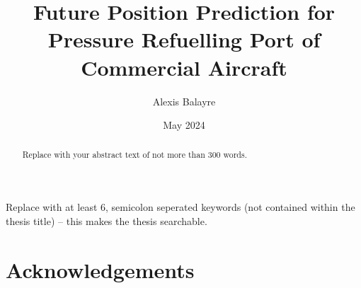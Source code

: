 \documentclass[12pt,oneside]{book} %
\title{Future Position Prediction for Pressure Refuelling Port
    of Commercial Aircraft}
\author{Alexis Balayre}
\date{May 2024}
\begin{document}
%
%

\frontmatter

\maketitle

\begin{abstract}
    Replace with your abstract text of not more than 300 words.
\end{abstract}

\begin{keywords}
    Replace with at least 6, semicolon seperated keywords (not contained within the thesis title) – this makes the thesis searchable.
\end{keywords}

\chapter{Acknowledgements}

 {
  \clearpage

  \singlespacing{
      \tableofcontents
  }
  \clearpage

  {%
      \let\oldnumberline\numberline%
      \renewcommand{\numberline}{\figurename~\oldnumberline}%
      \listoffigures%
  }

  \clearpage
  {%
      \let\oldnumberline\numberline%
      \renewcommand{\numberline}{\tablename~\oldnumberline}%
      \listoftables%
  }
 }
\end{document}
